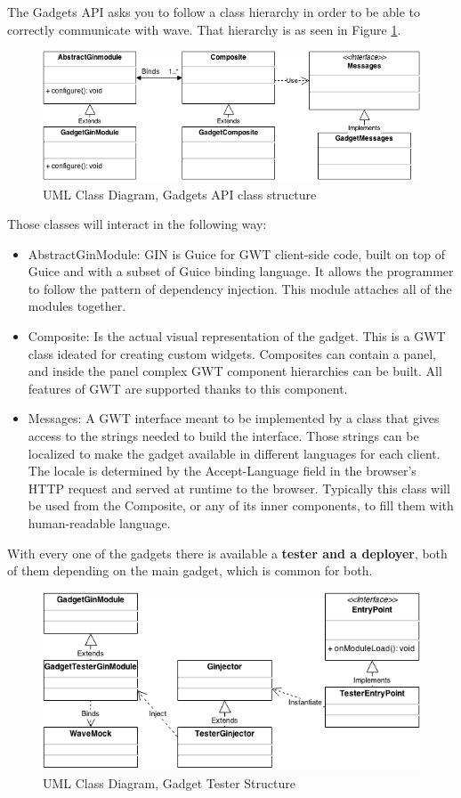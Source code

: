 The Gadgets API asks you to follow a class hierarchy in order to be able to correctly communicate with wave. That hierarchy is as seen in Figure \ref{fig:gadget_classes}.\\[.2cm]
\begin{figure}[h]
  \center
    \includegraphics[keepaspectratio, scale=0.5]{Media/Diagrams/Gadget/Gadget.png}
  \caption{UML Class Diagram, Gadgets API class structure}
  \label{fig:gadget_classes}
\end{figure}
Those classes will interact in the following way:
\begin{itemize}
  \item AbstractGinModule: GIN is Guice for GWT client-side code, built on top of Guice and with a subset of Guice binding language. It allows the programmer to follow the pattern of dependency injection. This module attaches all of the modules together.
  \item Composite: Is the actual visual representation of the gadget. This is a GWT class ideated for creating custom widgets. Composites can contain a panel, and inside the panel complex GWT component hierarchies can be built. All features of GWT are supported thanks to this component.
  \item Messages: A GWT interface meant to be implemented by a class that gives access to the strings needed to build the interface. Those strings can be localized to make the gadget available in different languages for each client. The locale is determined by the Accept-Language field in the browser's HTTP request \cite{ref:gwt_internationalization} and served at runtime to the browser. Typically this class will be used from the Composite, or any of its inner components, to fill them with human-readable language.
\end{itemize}
With every one of the gadgets there is available a \textbf{tester and a deployer}, both of them depending on the main gadget, which is common for both.
\begin{figure}[H]
  \center
    \includegraphics[keepaspectratio, scale=0.5]{Media/Diagrams/Gadget/Tester.png}
  \caption{UML Class Diagram, Gadget Tester Structure}
  \label{fig:gadget_tester}
\end{figure}

